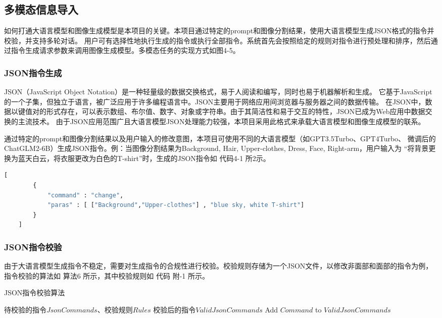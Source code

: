 \documentclass[a4paper,AutoFakeBold,oneside,12pt]{book}
\begin{document}
\subsection{多模态信息导入}
如何打通大语言模型和图像生成模型是本项目的关键。本项目通过特定的prompt和图像分割结果，使用大语言模型生成JSON格式的指令并校验，并支持多轮对话。
用户可有选择性地执行生成的指令或执行全部指令。系统首先会按照给定的规则对指令进行预处理和排序，然后通过指令生成请求参数来调用图像生成模型。多模态任务的实现方式如图4-5。

\subsubsection{JSON指令生成}
JSON（JavaScript Object Notation）是一种轻量级的数据交换格式，易于人阅读和编写，同时也易于机器解析和生成。
它基于JavaScript的一个子集，但独立于语言，被广泛应用于许多编程语言中。JSON主要用于网络应用间浏览器与服务器之间的数据传输。
在JSON中，数据以键值对的形式存在，可以表示数组、布尔值、数字、对象或字符串。由于其简洁性和易于交互的特性，JSON已成为Web应用中数据交换的主流技术。
由于JSON应用范围广且大语言模型JSON处理能力较强，本项目采用此格式来承载大语言模型和图像生成模型的联系。

通过特定的prompt和图像分割结果以及用户输入的修改意图，本项目可使用不同的大语言模型（如GPT3.5Turbo、GPT4Turbo、
微调后的ChatGLM2-6B）生成JSON指令。例：当图像分割结果为Background, Hair, Upper-clothes, Dress, Face, Right-arm，用户输入为
“将背景更换为蓝天白云，将衣服更改为白色的T-shirt”时，生成的JSON指令如 代码4-1 所2示。

\begin{lstlisting}[language=Python, caption=生成的指令, label=plus, tabsize=2]  
    [
        {
            "command" : "change",
            "paras" : [ ["Background","Upper-clothes"] , "blue sky, white T-shirt"]
        }
    ]
\end{lstlisting} 

\subsubsection{JSON指令校验}
由于大语言模型生成指令不稳定，需要对生成指令的合规性进行校验。校验规则存储为一个JSON文件，以修改非面部和面部的指令为例，指令校验的算法如 算法6 所示，其中校验规则如 代码 附-1 所示。
\begin{algorithm} 
	\begin{spacing}{1.3}
		\caption{JSON指令校验算法} 
		\label{JsonCommandCheckAlgorithm}
		\renewcommand{\algorithmicrequire}{\textbf{输入：}}
		\renewcommand{\algorithmicensure}{\textbf{输出：}} 
			\begin{algorithmic}[1] 
				\Require 待校验的指令$JsonCommands$、校验规则$Rules$
				\Ensure 校验后的指令$ValidJsonCommands$
                        \State Add $Command$ to $ValidJsonCommands$
                    \EndIf
                \EndFor
			\end{algorithmic}
	\end{spacing}
\end{algorithm}
\end{document}
